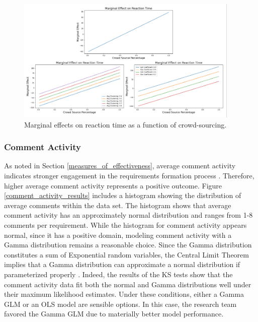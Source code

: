 \begin{figure}
  \includegraphics[width=0.95\textwidth]{reaction_time_marginal.PNG}
\caption{Marginal effects on reaction time as a function of crowd-sourcing.}
\label{reaction_time_marginal}
\end{figure}

\subsubsection{Comment Activity}
\label{comment_activity}

As noted in Section \ref{measures_of_effectiveness}, average comment activity indicates stronger engagement in the requirements formation process \cite{toral}. Therefore, higher average comment activity represents a positive outcome. Figure \ref{comment_activity_results} includes a histogram showing the distribution of average comments within the data set. The histogram shows that average comment activity has an approximately normal distribution and ranges from 1-8 comments per requirement. While the histogram for comment activity appears normal, since it has a positive domain, modeling comment activity with a Gamma distribution remains a reasonable choice. Since the Gamma distribution constitutes a sum of Exponential random variables, the Central Limit Theorem implies that a Gamma distribution can approximate a normal distribution if parameterized properly \cite{wackerly}. Indeed, the results of the KS tests show that the comment activity data fit both the normal and Gamma distributions well under their maximum likelihood estimates. Under these conditions, either a Gamma GLM or an OLS model are sensible options. In this case, the research team favored the Gamma GLM due to materially better model performance.

